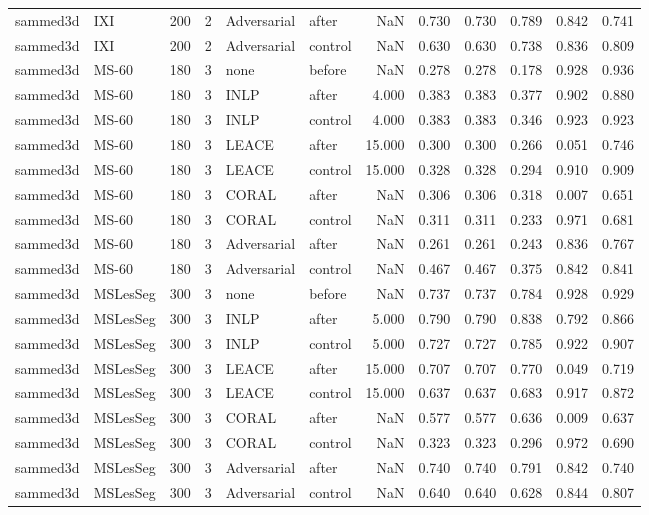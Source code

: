\begin{tabular}{llrrllrrrrrr}
sammed3d & IXI & 200 & 2 & Adversarial & after & NaN & 0.730 & 0.730 & 0.789 & 0.842 & 0.741 \\
sammed3d & IXI & 200 & 2 & Adversarial & control & NaN & 0.630 & 0.630 & 0.738 & 0.836 & 0.809 \\
sammed3d & MS-60 & 180 & 3 & none & before & NaN & 0.278 & 0.278 & 0.178 & 0.928 & 0.936 \\
sammed3d & MS-60 & 180 & 3 & INLP & after & 4.000 & 0.383 & 0.383 & 0.377 & 0.902 & 0.880 \\
sammed3d & MS-60 & 180 & 3 & INLP & control & 4.000 & 0.383 & 0.383 & 0.346 & 0.923 & 0.923 \\
sammed3d & MS-60 & 180 & 3 & LEACE & after & 15.000 & 0.300 & 0.300 & 0.266 & 0.051 & 0.746 \\
sammed3d & MS-60 & 180 & 3 & LEACE & control & 15.000 & 0.328 & 0.328 & 0.294 & 0.910 & 0.909 \\
sammed3d & MS-60 & 180 & 3 & CORAL & after & NaN & 0.306 & 0.306 & 0.318 & 0.007 & 0.651 \\
sammed3d & MS-60 & 180 & 3 & CORAL & control & NaN & 0.311 & 0.311 & 0.233 & 0.971 & 0.681 \\
sammed3d & MS-60 & 180 & 3 & Adversarial & after & NaN & 0.261 & 0.261 & 0.243 & 0.836 & 0.767 \\
sammed3d & MS-60 & 180 & 3 & Adversarial & control & NaN & 0.467 & 0.467 & 0.375 & 0.842 & 0.841 \\
sammed3d & MSLesSeg & 300 & 3 & none & before & NaN & 0.737 & 0.737 & 0.784 & 0.928 & 0.929 \\
sammed3d & MSLesSeg & 300 & 3 & INLP & after & 5.000 & 0.790 & 0.790 & 0.838 & 0.792 & 0.866 \\
sammed3d & MSLesSeg & 300 & 3 & INLP & control & 5.000 & 0.727 & 0.727 & 0.785 & 0.922 & 0.907 \\
sammed3d & MSLesSeg & 300 & 3 & LEACE & after & 15.000 & 0.707 & 0.707 & 0.770 & 0.049 & 0.719 \\
sammed3d & MSLesSeg & 300 & 3 & LEACE & control & 15.000 & 0.637 & 0.637 & 0.683 & 0.917 & 0.872 \\
sammed3d & MSLesSeg & 300 & 3 & CORAL & after & NaN & 0.577 & 0.577 & 0.636 & 0.009 & 0.637 \\
sammed3d & MSLesSeg & 300 & 3 & CORAL & control & NaN & 0.323 & 0.323 & 0.296 & 0.972 & 0.690 \\
sammed3d & MSLesSeg & 300 & 3 & Adversarial & after & NaN & 0.740 & 0.740 & 0.791 & 0.842 & 0.740 \\
sammed3d & MSLesSeg & 300 & 3 & Adversarial & control & NaN & 0.640 & 0.640 & 0.628 & 0.844 & 0.807 \\

\end{tabular}
